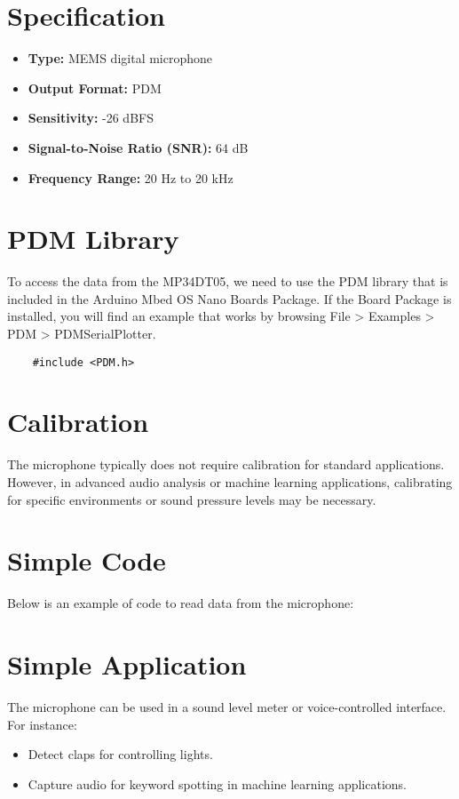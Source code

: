 \section{Specification}

\begin{itemize}
	\item \textbf{Type:} MEMS digital microphone
	\item \textbf{Output Format:} PDM
	\item \textbf{Sensitivity:} -26 dBFS
	\item \textbf{Signal-to-Noise Ratio (SNR):} 64 dB
	\item \textbf{Frequency Range:} 20 Hz to 20 kHz
\end{itemize}

\section{PDM Library}

To access the data from the MP34DT05, we need to use the PDM library that is included in the Arduino Mbed OS Nano Boards Package. If the Board Package is installed, you will find an example that works by browsing File > Examples > PDM > PDMSerialPlotter.

\begin{verbatim}
	#include <PDM.h>
\end{verbatim}

\section{Calibration}

The microphone typically does not require calibration for standard applications. However, in advanced audio analysis or machine learning applications, calibrating for specific environments or sound pressure levels may be necessary.

\section{Simple Code}

Below is an example of code to read data from the microphone:


{
	\label{lst:pdm_microphone}
}


\section{Simple Application}
The microphone can be used in a sound level meter or voice-controlled interface. For instance:
\begin{itemize}
	\item Detect claps for controlling lights.
	\item Capture audio for keyword spotting in machine learning applications.
\end{itemize}


